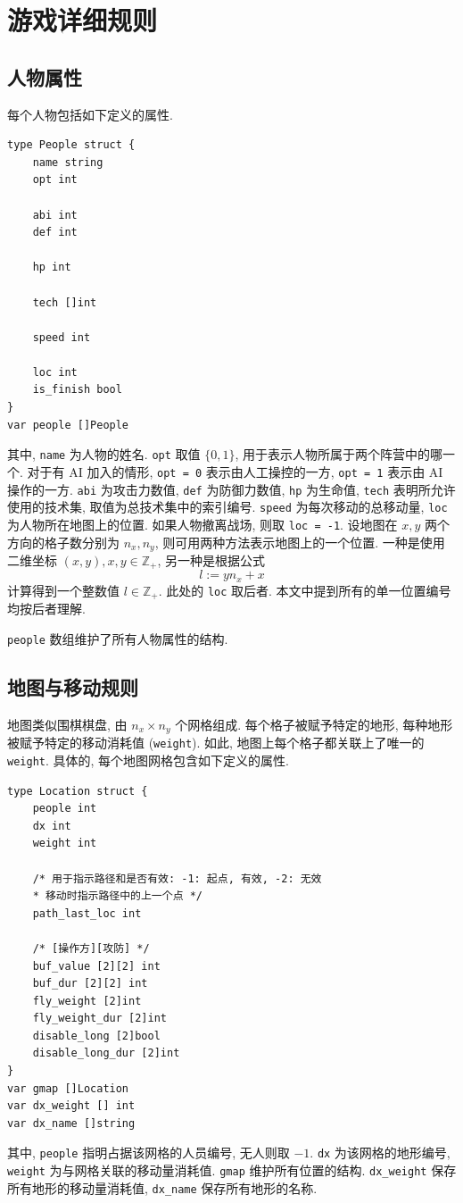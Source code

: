 \documentclass[UTF8, zihao=-4]{ctexart} %
\newcommand{\inte}{\mathbb{Z}} %
\newcommand{\lcode}{\lstinline} % 段内插入代码
\begin{document}
\section{游戏详细规则}
\subsection{人物属性}
每个人物包括如下定义的属性.
\begin{lstlisting}
type People struct {
	name string
	opt int

	abi int
	def int

	hp int

	tech []int

	speed int

	loc int
	is_finish bool
}
var people []People
\end{lstlisting}
其中, \lcode{name} 为人物的姓名. \lcode{opt} 取值 $\{0, 1\}$, 用于表示人物所属于两个阵营中的哪一个.
对于有 AI 加入的情形, \lcode{opt = 0} 表示由人工操控的一方, \lcode{opt = 1} 表示由 AI 操作的一方.
\lcode{abi} 为攻击力数值,  \lcode{def} 为防御力数值, \lcode{hp} 为生命值, 
\lcode{tech} 表明所允许使用的技术集, 取值为总技术集中的索引编号. 
\lcode{speed} 为每次移动的总移动量, \lcode{loc} 为人物所在地图上的位置. 如果人物撤离战场, 则取 \lcode{loc = -1}.
设地图在 $x, y$ 两个方向的格子数分别为 $n_x, n_y$, 则可用两种方法表示地图上的一个位置. 
一种是使用二维坐标 $(x, y), x, y \in \inte_+$, 另一种是根据公式
\begin{equation}
      \label{e_loc}
      l := yn_x + x
\end{equation}
计算得到一个整数值 $l \in \inte_+$. 此处的 \lcode{loc} 取后者. 本文中提到所有的单一位置编号均按后者理解.

\lcode{people} 数组维护了所有人物属性的结构.

\subsection{地图与移动规则}
地图类似围棋棋盘, 由 $n_x \times n_y$ 个网格组成. 每个格子被赋予特定的地形, 每种地形被赋予特定的移动消耗值 (\lcode{weight}).
如此, 地图上每个格子都关联上了唯一的 \lcode{weight}. 具体的, 每个地图网格包含如下定义的属性.
\begin{lstlisting}
type Location struct {
	people int
	dx int
	weight int

	/* 用于指示路径和是否有效: -1: 起点, 有效, -2: 无效 
	* 移动时指示路径中的上一个点 */
	path_last_loc int 

	/* [操作方][攻防] */
	buf_value [2][2] int
	buf_dur [2][2] int
	fly_weight [2]int
	fly_weight_dur [2]int
	disable_long [2]bool
	disable_long_dur [2]int
}
var gmap []Location 
var dx_weight [] int
var dx_name []string

\end{lstlisting}
其中, \lcode{people} 指明占据该网格的人员编号, 无人则取 $-1$. \lcode{dx} 为该网格的地形编号, 
\lcode{weight} 为与网格关联的移动量消耗值. \lcode{gmap} 维护所有位置的结构. 
\lcode{dx_weight} 保存所有地形的移动量消耗值, \lcode{dx_name} 保存所有地形的名称.
\end{document}
